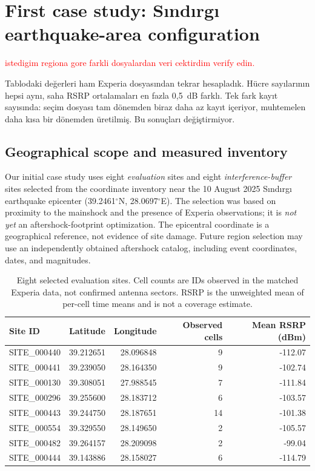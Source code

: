 \documentclass[11pt,a4paper]{article}
\newcommand{\red}[1]{\textcolor{red}{#1}}
\newenvironment{progress}{\par\smallskip\color{blue}}{\par\smallskip}
\begin{document}
\section{First case study: S\i nd\i rg\i{} earthquake-area configuration}
\label{sec:sindirgi}
\red{istedigim regiona gore farkli dosyalardan veri cektirdim verify edin.}

\begin{progress}
Tablodaki değerleri ham Experia dosyasından tekrar hesapladık. Hücre sayılarının hepsi aynı, saha RSRP ortalamaları en fazla 0,5~dB farklı. Tek fark kayıt sayısında: seçim dosyası tam dönemden biraz daha az kayıt içeriyor, muhtemelen daha kısa bir dönemden üretilmiş. Bu sonuçları değiştirmiyor.
\end{progress}
\subsection{Geographical scope and measured inventory}
Our initial case study uses eight \emph{evaluation} sites and eight \emph{interference-buffer} sites selected from the coordinate inventory near the 10 August 2025 S\i nd\i rg\i{} earthquake epicenter (39.2461$^\circ$N, 28.0697$^\circ$E). The selection was based on proximity to the mainshock and the presence of Experia observations; it is \emph{not yet} an aftershock-footprint optimization. The epicentral coordinate is a geographical reference, not evidence of site damage. Future region selection may use an independently obtained aftershock catalog, including event coordinates, dates, and magnitudes.

\begin{table}[htbp]\centering\small
\caption{Eight selected evaluation sites. Cell counts are IDs observed in the matched Experia data, not confirmed antenna sectors. RSRP is the unweighted mean of per-cell time means and is not a coverage estimate.}
\label{tab:sindirgi_sites}
\begin{tabular}{@{}lrrrr@{}}\toprule
Site ID & Latitude & Longitude & Observed cells & Mean RSRP (dBm)\\\midrule
SITE\_000440 & 39.212651 & 28.096848 & 9 & -112.07\\
SITE\_000441 & 39.239050 & 28.164350 & 9 & -102.74\\
SITE\_000130 & 39.308051 & 27.988545 & 7 & -111.84\\
SITE\_000296 & 39.255600 & 28.183712 & 6 & -103.57\\
SITE\_000443 & 39.244750 & 28.187651 & 14 & -101.38\\
SITE\_000554 & 39.329550 & 28.149650 & 2 & -105.57\\
SITE\_000482 & 39.264157 & 28.209098 & 2 & -99.04\\
SITE\_000444 & 39.143886 & 28.158027 & 6 & -114.79\\\bottomrule
\end{tabular}
\end{table}
\end{document}
